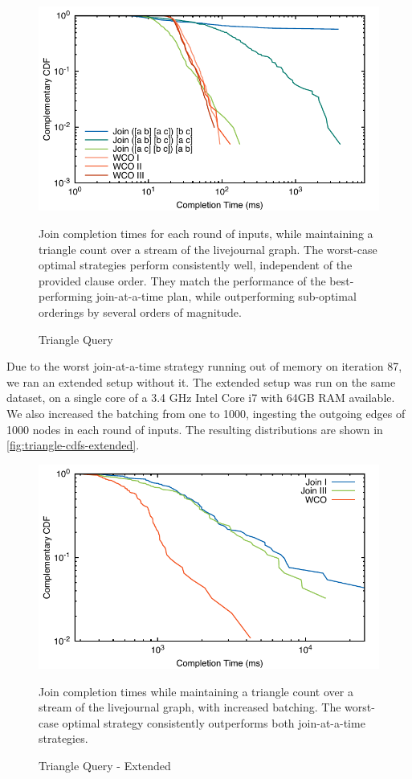 \documentclass[../catalog.tex]{subfiles}
\begin{document}
\begin{figure}[h!]
  \includegraphics[width=1.0\linewidth]{results/triangles/out/all_cdfs}
  \caption{Triangle Query}
  \label{fig:triangle-cdfs}
  \medskip
  \small

  Join completion times for each round of inputs, while maintaining a
  triangle count over a stream of the livejournal graph. The
  worst-case optimal strategies perform consistently well, independent
  of the provided clause order. They match the performance of the
  best-performing join-at-a-time plan, while outperforming sub-optimal
  orderings by several orders of magnitude.
\end{figure}

Due to the worst join-at-a-time strategy running out of memory on
iteration 87, we ran an extended setup without it. The extended setup
was run on the same dataset, on a single core of a 3.4 GHz Intel Core
i7 with 64GB RAM available. We also increased the batching from one to
1000, ingesting the outgoing edges of 1000 nodes in each round of
inputs. The resulting distributions are shown in
\autoref{fig:triangle-cdfs-extended}.

\begin{figure}[h!]
  \includegraphics[width=1.0\linewidth]{results/triangles/out/batch_cdf}
  \caption{Triangle Query - Extended}
  \label{fig:triangle-cdfs-extended}

  Join completion times while maintaining a triangle count over a
  stream of the livejournal graph, with increased batching. The
  worst-case optimal strategy consistently outperforms both
  join-at-a-time strategies.
\end{figure}
\end{document}
